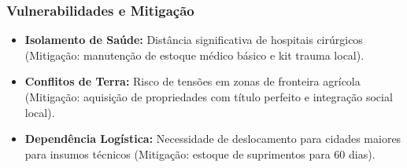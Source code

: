 \subsubsection{Vulnerabilidades e
Mitigação}

\begin{itemize}
\tightlist
\item
  \textbf{Isolamento de Saúde:} Distância significativa de hospitais
  cirúrgicos (Mitigação: manutenção de estoque médico básico e kit
  trauma local).
\item
  \textbf{Conflitos de Terra:} Risco de tensões em zonas de fronteira
  agrícola (Mitigação: aquisição de propriedades com título perfeito e
  integração social local).
\item
  \textbf{Dependência Logística:} Necessidade de deslocamento para
  cidades maiores para insumos técnicos (Mitigação: estoque de
  suprimentos para 60 dias).
\end{itemize}

